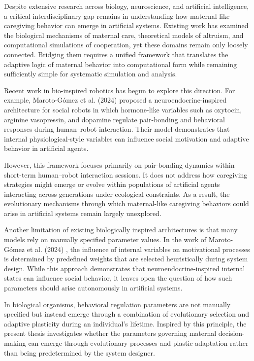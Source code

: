 Despite extensive research across biology, neuroscience, and artificial intelligence, a critical interdisciplinary gap remains in understanding how maternal-like caregiving behavior can emerge in artificial systems. Existing work has examined the biological mechanisms of maternal care, theoretical models of altruism, and computational simulations of cooperation, yet these domains remain only loosely connected. Bridging them requires a unified framework that translates the adaptive logic of maternal behavior into computational form while remaining sufficiently simple for systematic simulation and analysis.

Recent work in bio-inspired robotics has begun to explore this direction. For example, Maroto-Gómez et al. (2024) \cite{marotogomez2024} proposed a neuroendocrine-inspired architecture for social robots in which hormone-like variables such as oxytocin, arginine vasopressin, and dopamine regulate pair-bonding and behavioral responses during human--robot interaction. Their model demonstrates that internal physiological-style variables can influence social motivation and adaptive behavior in artificial agents.

However, this framework focuses primarily on pair-bonding dynamics within short-term human--robot interaction sessions. It does not address how caregiving strategies might emerge or evolve within populations of artificial agents interacting across generations under ecological constraints. As a result, the evolutionary mechanisms through which maternal-like caregiving behaviors could arise in artificial systems remain largely unexplored.

Another limitation of existing biologically inspired architectures is that many models rely on manually specified parameter values. In the work of Maroto-Gómez et al. (2024) \cite{marotogomez2024}, the influence of internal variables on motivational processes is determined by predefined weights that are selected heuristically during system design. While this approach demonstrates that neuroendocrine-inspired internal states can influence social behavior, it leaves open the question of how such parameters should arise autonomously in artificial systems.

In biological organisms, behavioral regulation parameters are not manually specified but instead emerge through a combination of evolutionary selection and adaptive plasticity during an individual's lifetime. Inspired by this principle, the present thesis investigates whether the parameters governing maternal decision-making can emerge through evolutionary processes and plastic adaptation rather than being predetermined by the system designer.

